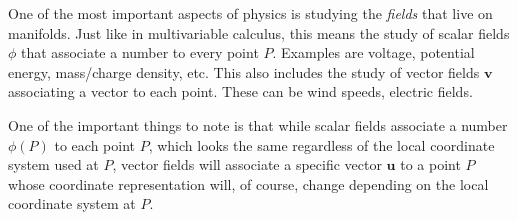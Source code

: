 	One of the most important aspects of physics is studying the \emph{fields} that live on manifolds. Just like in multivariable calculus, this means the study of scalar fields $\phi$ that associate a number to every point $P$. Examples are voltage, potential energy, mass/charge density, etc. This also includes the study of vector fields $\mathbf v$ associating a vector to each point. These can be wind speeds, electric fields. 
	
	One of the important things to note is that while scalar fields associate a number $\phi(P)$ to each point $P$, which looks the same regardless of the local coordinate system used at $P$, vector fields will associate a specific vector $\mathbf u$ to a point $P$ whose coordinate representation will, of course, change depending on the local coordinate system at $P$. 